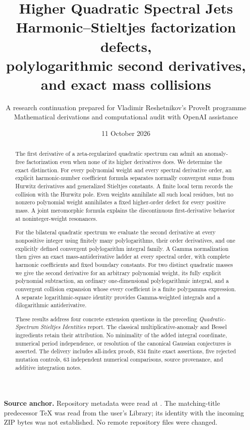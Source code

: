 \title{\textbf{Higher Quadratic Spectral Jets}\\[7pt]
\large Harmonic--Stieltjes factorization defects,\\
polylogarithmic second derivatives, and exact mass collisions}
\author{A research continuation prepared for Vladimir Reshetnikov's ProveIt programme\\
\small Mathematical derivations and computational audit with OpenAI assistance}
\date{11 October 2026}

\maketitle
\thispagestyle{plain}
\begin{abstract}
The first derivative of a zeta-regularized quadratic spectrum can admit an
anomaly-free factorization even when none of its higher derivatives does.
We determine the exact distinction. For every polynomial weight and every
spectral derivative order, an explicit harmonic-number coefficient formula
separates normally convergent sums from Hurwitz derivatives and generalized
Stieltjes constants. A finite local term records the collision with the
Hurwitz pole. Even weights annihilate all such local residues, but no
nonzero polynomial weight annihilates a fixed higher-order defect for every
positive mass. A joint meromorphic formula explains the discontinuous
first-derivative behavior at noninteger-weight resonances.

For the bilateral quadratic spectrum we evaluate the second derivative at
every nonpositive integer using finitely many polylogarithms, their order
derivatives, and one explicitly defined convergent polylogarithm integral
family. A Gamma normalization then gives an exact mass-antiderivative
ladder at every spectral order, with complete harmonic coefficients and
fixed boundary constants. For two distinct quadratic masses we give the
second derivative for an arbitrary polynomial weight, its fully explicit
polynomial subtraction, an ordinary one-dimensional polylogarithmic
integral, and a convergent collision expansion whose every coefficient is
a finite polygamma expression. A separate logarithmic-square identity
provides Gamma-weighted integrals and a dilogarithmic antiderivative.

These results address four concrete extension questions in the preceding
\emph{Quadratic-Spectrum Stieltjes Identities} report. The classical
multiplicative-anomaly and Bessel ingredients retain their attribution.
No minimality of the added integral coordinate, numerical period
independence, or resolution of the canonical Gaussian conjectures is
asserted. The delivery includes all-index proofs, 834 finite exact
assertions, five rejected mutation controls, 63 independent numerical
comparisons, source provenance, and additive integration notes.
\end{abstract}
\medskip
\noindent\textbf{Source anchor.} Repository metadata were read at \pin.
The matching-title predecessor TeX was read from the user's Library;
its identity with the incoming ZIP bytes was not established. No remote
repository files were changed.
\clearpage
\begingroup\small\tableofcontents\endgroup
\clearpage
